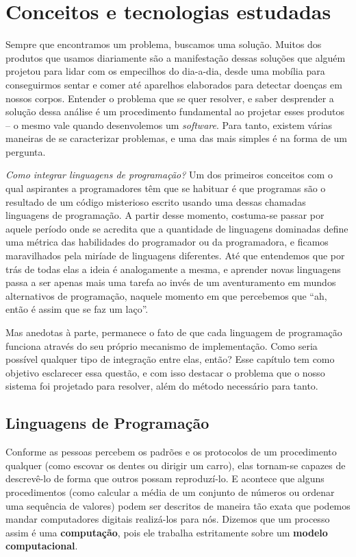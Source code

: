 
\chapter{Conceitos e tecnologias estudadas}
\label{cap:conceitos}
  Sempre que encontramos um problema, buscamos uma solução. Muitos dos produtos
  que usamos diariamente são a manifestação dessas soluções que alguém projetou
  para lidar com os empecilhos do dia-a-dia, desde uma mobília para conseguirmos
  sentar e comer até aparelhos elaborados para detectar doenças em nossos
  corpos. Entender o problema que se quer resolver, e saber desprender a solução
  dessa análise é um procedimento fundamental ao projetar esses produtos -- o
  mesmo vale quando desenvolemos um \textit{software}. Para tanto, existem
  várias maneiras de se caracterizar problemas, e uma das mais simples é na
  forma de um pergunta.

  \emph{Como integrar linguagens de programação?} Um dos primeiros
  conceitos com o qual aspirantes a programadores têm que se habituar é que
  programas são o resultado de um código misterioso escrito usando uma dessas
  chamadas linguagens de programação. A partir desse momento, costuma-se passar
  por aquele período onde se acredita que a quantidade de linguagens dominadas
  define uma métrica das habilidades do programador ou da programadora, e
  ficamos maravilhados pela miríade de linguagens diferentes. Até que entendemos
  que por trás de todas elas a ideia é analogamente a mesma\footnotemark{}, e
  aprender novas linguagens passa a ser apenas mais uma tarefa ao invés de um
  aventuramento em mundos alternativos de programação, naquele momento em que
  percebemos que ``ah, então é assim que se faz um laço''.
  
  Mas anedotas à parte, permanece o fato de que cada linguagem de programação
  funciona através do seu próprio mecanismo de implementação. Como seria
  possível qualquer tipo de integração entre elas, então? Esse capítulo tem
  como objetivo esclarecer essa questão, e com isso destacar o problema que
  o nosso sistema foi projetado para resolver, além do método necessário para
  tanto.

  \section{Linguagens de Programação}
  \label{cap:conceitos:linguagens}

  Conforme as pessoas percebem os padrões e os protocolos de um procedimento
  qualquer (como escovar os dentes ou dirigir um carro), elas tornam-se capazes
  de descrevê-lo de forma que outros possam reproduzí-lo. E acontece que alguns
  procedimentos (como calcular a média de um conjunto de números ou ordenar uma
  sequência de valores) podem ser descritos de maneira tão exata que podemos
  mandar computadores digitais realizá-los para nós. Dizemos que um processo
  assim é uma \textbf{computação}, pois ele trabalha estritamente sobre um
  \textbf{modelo computacional}.
  
